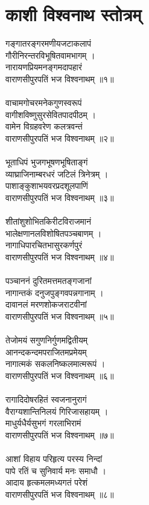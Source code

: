 \section{\sanskrit काशी विश्वनाथ स्तोत्रम्}
\chandas
गङ्गातरङ्गरमणीयजटाकलापं\\
गौरीनिरन्तरविभूषितवामभागम् ।\\
नारायणप्रियमनङ्गमदापहारं\\
वाराणसीपुरपतिं भज विश्वनाथम् ॥१॥\\
\\
वाचामगोचरमनेकगुणस्वरूपं\\
वागीशविष्णुसुरसेवितपादपीठम् ।\\
वामेन विग्रहवरेण कलत्रवन्तं\\
वाराणसीपुरपतिं भज विश्वनाथम् ॥२॥\\
\\
भूताधिपं भुजगभूषणभूषिताङ्गं\\
व्याघ्राजिनाम्बरधरं जटिलं त्रिनेत्रम् ।\\
पाशाङ्कुशाभयवरप्रदशूलपाणिं\\
वाराणसीपुरपतिं भज विश्वनाथम् ॥३॥\\
\\
शीतांशुशोभितकिरीटविराजमानं\\
भालेक्षणानलविशोषितपञ्चबाणम् ।\\
नागाधिपारचितभासुरकर्णपुरं\\
वाराणसीपुरपतिं भज विश्वनाथम् ॥४॥\\
\\
पञ्चाननं दुरितमत्तमतङ्गजानां\\
नागान्तकं दनुजपुङ्गवपन्नगानाम् ।\\
दावानलं मरणशोकजराटवीनां\\
वाराणसीपुरपतिं भज विश्वनाथम् ॥५॥\\
\\
तेजोमयं सगुणनिर्गुणमद्वितीयम्\\
आनन्दकन्दमपराजितमप्रमेयम्\\
नागात्मकं सकलनिष्कलमात्मरूपं ।\\
वाराणसीपुरपतिं भज विश्वनाथम् ॥६॥\\
\\
रागादिदोषरहितं स्वजनानुरागं\\
वैराग्यशान्तिनिलयं गिरिजासहायम् ।\\
माधुर्यधैर्यसुभगं गरलाभिरामं\\
वाराणसीपुरपतिं भज विश्वनाथम् ॥७॥\\
\\
आशां विहाय परिहृत्य परस्य निन्दां\\
पापे रतिं च सुनिवार्य मनः समाधौ ।\\
आदाय हृत्कमलमध्यगतं परेशं\\
वाराणसीपुरपतिं भज विश्वनाथम् ॥८॥\\

